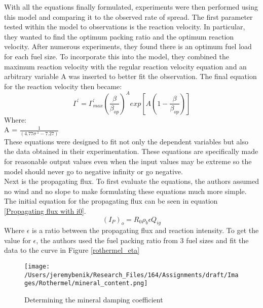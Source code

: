 \documentclass{article}
\begin{document}
\indent With all the equations finally formulated, experiments were then performed using this model and comparing it to the observed rate of spread. The first parameter tested within the model to observations is the reaction velocity. In particular, they wanted to find the optimum packing ratio and the optimum reaction velocity. After numerous experiments, they found there is an optimum fuel load for each fuel size. To incorporate this into the model, they combined the maximum reaction velocity with the regular reaction velocity equation and an arbitrary variable A was inserted to better fit the observation. The final equation for the reaction velocity then became: 
\begin{equation}
	\label{Final Reaction Velocity}
	\Gamma ^ {'} = \Gamma ^ {'}_{max} (\frac {\beta} {\beta _ {op}}) ^ {A} exp[A(1 - \frac {\beta} {\beta _ {op}})]
\end{equation}
Where: \\
A = $\frac {1} {(4.77 \sigma ^ {.1} - 7.27)}$\\
\indent These equations were designed to fit not only the dependent variables but also the data obtained in their experimentation. These equations are specifically made for reasonable output values even when the input values may be extreme so the model should never go to negative infinity or go negative. \\
\indent Next is the propagating flux. To first evaluate the equations, the authors assumed no wind and no slope to make formulating these equations much more simple. The initial equation for the propagating flux can be seen in equation \ref{Propagating flux with i0}.
\begin{equation}
	\label{Propagating flux with i0}
	(I_P)_o = R_0 \rho _ b \epsilon Q_{ig}
\end{equation}
Where $\epsilon$ is a ratio between the propagating flux and reaction intensity. To get the value for $\epsilon$, the authors used the fuel packing ratio from 3 fuel sizes and fit the data to the curve in Figure \ref{rothermel_eta}
\begin{figure}
  \texttt{[image: /Users/jeremybenik/Research\_Files/164/Assignments/draft/Images/Rothermel/mineral\_content.png]}
  \caption{Determining the mineral damping coefficient }
  \label{rothermel_mineral_damping}
\end{figure}
\end{document}
